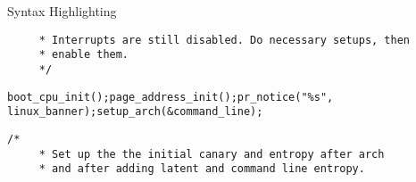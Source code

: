 \begin{frame}{Syntax Highlighting}
\begin{verbatim}
	 * Interrupts are still disabled. Do necessary setups, then
	 * enable them.
	 */\end{verbatim}\leavevmode\newline\tab\color{Aquamarine}\verb$boot_cpu_init$\color{Fuchsia}\verb$($\color{Fuchsia}\verb$)$\color{Fuchsia}\verb$;$\newline\tab\color{Aquamarine}\verb$page_address_init$\color{Fuchsia}\verb$($\color{Fuchsia}\verb$)$\color{Fuchsia}\verb$;$\newline\tab\color{Aquamarine}\verb$pr_notice$\color{Fuchsia}\verb$($\color{Emerald}\verb$"%s"$\color{Fuchsia}\verb$,$ \color{Aquamarine}\verb$linux_banner$\color{Fuchsia}\verb$)$\color{Fuchsia}\verb$;$\newline\tab\color{Aquamarine}\verb$setup_arch$\color{Fuchsia}\verb$($\color{Goldenrod}\verb$&$\color{Aquamarine}\verb$command_line$\color{Fuchsia}\verb$)$\color{Fuchsia}\verb$;$\newline\tab\color{Rhodamine}\begin{verbatim}/*
	 * Set up the the initial canary and entropy after arch
	 * and after adding latent and command line entropy.

\end{verbatim}
\end{frame}
